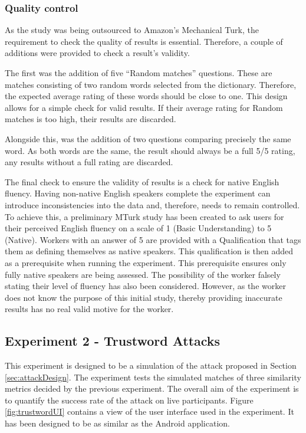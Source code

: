 \subsubsection*{Quality control}
\label{sec:exp1_qualitycontrol}
As the study was being outsourced to Amazon's Mechanical Turk, the requirement to check the quality of results is essential. Therefore, a couple of additions were provided to check a result's validity.

The first was the addition of five ``Random matches'' questions. These are matches consisting of two random words selected from the dictionary. Therefore, the expected average rating of these words should be close to one. This design allows for a simple check for valid results. If their average rating for Random matches is too high, their results are discarded.

Alongside this, was the addition of two questions comparing precisely the same word. As both words are the same, the result should always be a full 5/5 rating, any results without a full rating are discarded. 

The final check to ensure the validity of results is a check for native English fluency. Having non-native English speakers complete the 
experiment can introduce inconsistencies into the 
data and, therefore, needs to remain controlled. To achieve this, a preliminary MTurk study has been created to ask users for their perceived 
English fluency on a scale of 1 (Basic Understanding) to 5 (Native). 
Workers with an answer of 5 are provided with a 
Qualification
that tags them as defining themselves as native speakers. This qualification is then 
added as a prerequisite when running the experiment. This prerequisite ensures 
only fully native speakers are being assessed. The possibility of the 
worker falsely stating their level of fluency has also been considered. 
However, as the worker does not know the purpose of this initial study,
thereby providing inaccurate results has no real valid motive for the 
worker.


\subsection{Experiment 2 - Trustword Attacks}
\label{sec:exp2_design}

This experiment is designed to be a simulation of the attack proposed in Section \ref{sec:attackDesign}. The experiment tests the simulated matches of three similarity metrics decided by the previous experiment. The overall aim of the experiment is to quantify the success rate of the attack on live participants. Figure \ref{fig:trustwordUI} contains a view of the user interface used in the experiment. It has been designed to be as similar as the \pep Android application.

